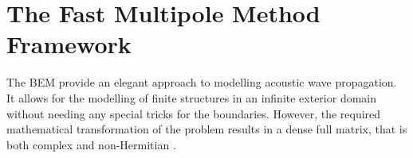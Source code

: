 \chapter{The Fast Multipole Method Framework}\label{chapter:fmm-framework}

The \ac{BEM} provide an elegant approach to modelling acoustic wave propagation. It allows for the modelling of finite structures in an infinite exterior domain without needing any special tricks for the boundaries. 
However, the required mathematical transformation of the problem results in a dense full matrix, that is both complex and non-Hermitian \cite{chandler-wildeboundaryelementmethods2007}.
\lipsum[1-5]
